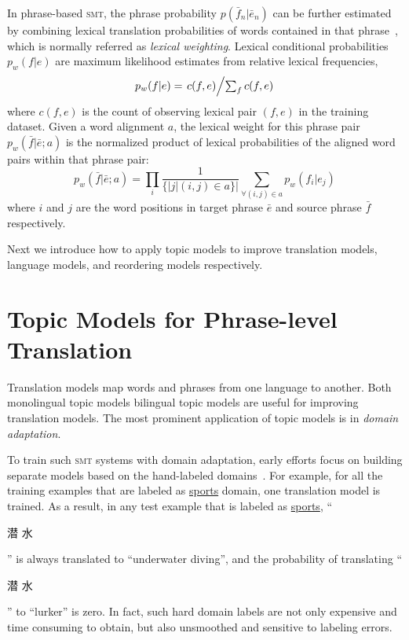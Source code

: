 In phrase-based \textsc{smt}, the phrase probability $p(\bar{f}_n |
\bar{e}_n)$ can be further estimated by combining lexical translation
probabilities of words contained in that phrase~\citep{koehn-03},
which is normally referred as \textit{lexical weighting}. Lexical
conditional probabilities $p_w(f|e)$ are maximum likelihood estimates
from relative lexical frequencies,
\begin{equation}
\label{eq:lexical_prob}
p_w(f|e) = \textstyle \left.c(f, e)\middle/\sum_f{c(f, e)}\right.
\end{equation}
where $c(f, e)$ is the count of observing lexical pair $(f, e)$ in the
training dataset. Given a word alignment $a$, the lexical weight for
this phrase pair $p_w(\bar{f} | \bar{e}; a)$ is the normalized product
of lexical probabilities of the aligned word pairs within that phrase
pair:
\begin{equation}
\label{eq:phrase_prob}
p_w(\bar{f} | \bar{e}; a) = \prod_{i} \frac{1}{\{|j | (i, j) \in a\}|} \sum_{\forall (i,j) \in a} p_w(f_i | e_j)
\end{equation}
where $i$ and $j$ are the word positions in target phrase $\bar{e}$
and source phrase $\bar{f}$ respectively.

Next we introduce how to apply topic models to improve translation
models, language models, and reordering models respectively.


\section{Topic Models for Phrase-level Translation}
\label{sec:trans-multiling}

Translation models map words and phrases from one language to another.
Both monolingual topic models bilingual topic models are useful for improving translation models.
The most prominent application of topic models is in {\em domain adaptation}.

To train such \textsc{smt} systems with domain adaptation, early
efforts focus on building separate models based on the hand-labeled
domains~\citep{foster-07,matsoukas-09,chiang-11}. For example, for all
the training examples that are labeled as \underline{sports} domain,
one translation model is trained. As a result, in any test example
that is labeled as \underline{sports}, ``\begin{CJK*}{UTF8}{gbsn}潜
  水\end{CJK*}'' is always translated to ``underwater diving'', and
  the probability of translating ``\begin{CJK*}{UTF8}{gbsn}潜
    水\end{CJK*}'' to ``lurker'' is zero. In fact, such hard domain
    labels are not only expensive and time consuming to obtain, but
    also unsmoothed and sensitive to labeling errors.

